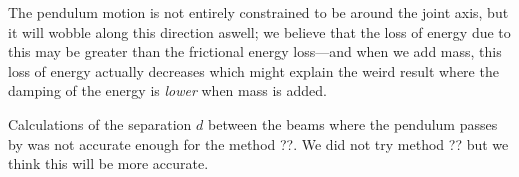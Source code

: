 The pendulum motion is not entirely constrained to be around the joint axis, but it will wobble along this direction aswell; we believe that the loss of energy due to this may be greater than the frictional energy loss---and when we add mass, this loss of energy actually decreases which might explain the weird result where the damping of the energy is \emph{lower} when mass is added.


Calculations of the separation $d$ between the beams where the pendulum passes by was not accurate enough
for the method ??. We did not try method ?? but we think this will be more accurate.